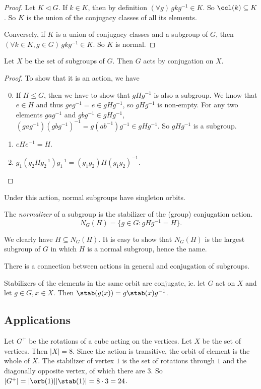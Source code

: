 \documentclass[a4paper]{article}
\begin{document}
\begin{proof}
  Let $K\lhd G$. If $k\in K$, then by definition $(\forall g)\,gkg^{-1}\in K$. So $\ccl(k)\subseteq K$. So $K$ is the union of the conjugacy classes of all its elements.

  Conversely, if $K$ is a union of conjugacy classes and a subgroup of $G$, then $(\forall k\in K, g\in G)\,gkg^{-1}\in K$. So $K$ is normal.
\end{proof}

\begin{lemma}
  Let $X$ be the set of subgroups of $G$. Then $G$ acts by conjugation on $X$.
\end{lemma}

\begin{proof}
  To show that it is an action, we have
  \begin{enumerate}[label=\arabic{*}.]
      \setcounter{enumi}{-1}
    \item If $H\leq G$, then we have to show that $gHg^{-1}$ is also a subgroup. We know that $e\in H$ and thus $geg^{-1} = e\in gHg^{-1}$, so $gHg^{-1}$ is non-empty. For any two elements $gag^{-1}$ and $gbg^{-1}\in gHg^{-1}$, $(gag^{-1})(gbg^{-1})^{-1} = g(ab^{-1})g^{-1}\in gHg^{-1}$. So $gHg^{-1}$ is a subgroup.
    \item $eHe^{-1} = H$.
    \item $g_1(g_2Hg_2^{-1})g_1^{-1} = (g_1g_2)H(g_1g_2)^{-1}$.
  \end{enumerate}
\end{proof}
Under this action, normal subgroups have singleton orbits.

\begin{defi}
  The \emph{normalizer} of a subgroup is the stabilizer of the (group) conjugation action.
  \[
    N_G(H) = \{g\in G: gHg^{-1} = H\}.
  \]
\end{defi}
We clearly have $H\subseteq N_G(H)$. It is easy to show that $N_G(H)$ is the largest subgroup of $G$ in which $H$ is a normal subgroup, hence the name.

There is a connection between actions in general and conjugation of subgroups.

\begin{lemma}
  Stabilizers of the elements in the same orbit are conjugate, ie. let $G$ act on $X$ and let $g\in G, x\in X$. Then $\stab(g(x)) = g\stab(x)g^{-1}$.
\end{lemma}

\subsection{Applications}
\begin{eg}
  Let $G^{+}$ be the rotations of a cube acting on the vertices. Let $X$ be the set of vertices. Then $|X| = 8$. Since the action is transitive, the orbit of element is the whole of $X$. The stabilizer of vertex $1$ is the set of rotations through $1$ and the diagonally opposite vertex, of which there are 3. So $|G^{+}| = |\orb(1)||\stab(1)| = 8\cdot 3 = 24$.
\end{eg}
\end{document}
